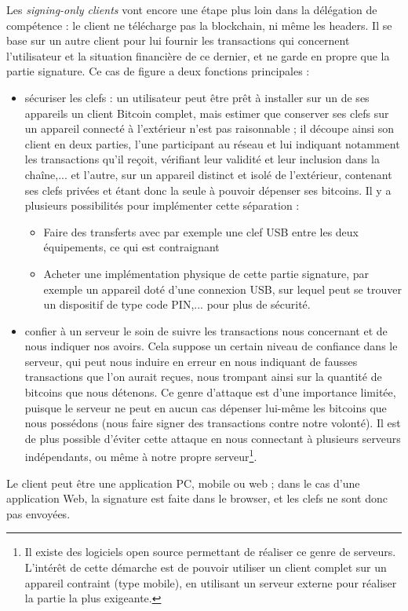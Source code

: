 \documentclass[11pt,a4paper]{article}
\begin{document}
Les \textit{signing-only clients} vont encore une étape plus loin dans la délégation de compétence : le client ne télécharge pas la blockchain, ni même les headers. Il se base sur un autre client pour lui fournir les transactions qui concernent l'utilisateur et la situation financière de ce dernier, et ne garde en propre que la partie signature. Ce cas de figure a deux fonctions principales :\begin{itemize}
	\item sécuriser les clefs : un utilisateur peut être prêt à installer sur un de ses appareils un client Bitcoin complet, mais estimer que conserver ses clefs sur un appareil connecté à l'extérieur n'est pas raisonnable ; il découpe ainsi son client en deux parties, l'une participant au réseau et lui indiquant notamment les transactions qu'il reçoit, vérifiant leur validité et leur inclusion dans la chaîne,... et l'autre, sur un appareil distinct et isolé de l'extérieur, contenant ses clefs privées et étant donc la seule à pouvoir dépenser ses bitcoins. Il y a plusieurs possibilités pour implémenter cette séparation :\begin{itemize}
		\item Faire des transferts avec par exemple une clef USB entre les deux équipements, ce qui est contraignant
		\item Acheter une implémentation physique de cette partie signature, par exemple un appareil doté d'une connexion USB, sur lequel peut se trouver un dispositif de type code PIN,... pour plus de sécurité.
	\end{itemize}
	\item confier à un serveur le soin de suivre les transactions nous concernant et de nous indiquer nos avoirs. Cela suppose un certain niveau de confiance dans le serveur, qui peut nous induire en erreur en nous indiquant de fausses transactions que l'on aurait reçues, nous trompant ainsi sur la quantité de bitcoins que nous détenons. Ce genre d'attaque est d'une importance limitée, puisque le serveur ne peut en aucun cas dépenser lui-même les bitcoins que nous possédons (nous faire signer des transactions contre notre volonté). Il est de plus possible d'éviter cette attaque en nous connectant à plusieurs serveurs indépendants, ou même à notre propre serveur\footnote{Il existe des logiciels open source permettant de réaliser ce genre de serveurs. L'intérêt de cette démarche est de pouvoir utiliser un client complet sur un appareil contraint (type mobile), en utilisant un serveur externe pour réaliser la partie la plus exigeante.}. 
\end{itemize}
Le client peut être une application PC, mobile ou web ; dans le cas d'une application Web, la signature est faite dans le browser, et les clefs ne sont donc pas envoyées.
\end{document}
